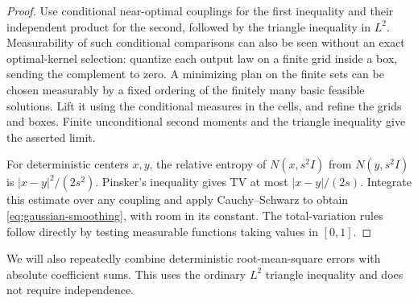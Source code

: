 \begin{proof}
Use conditional near-optimal couplings for the first
inequality and their independent product for the second,
followed by the triangle inequality in \(L^2\).
Measurability of such conditional comparisons can also be
seen without an exact optimal-kernel selection: quantize
each output law on a finite grid inside a box, sending
the complement to zero. A minimizing plan on the finite
sets can be chosen measurably by a fixed ordering of the
finitely many basic feasible solutions. Lift it using
the conditional measures in the cells, and refine the
grids and boxes. Finite unconditional second moments
and the triangle inequality give the asserted limit.

For deterministic centers \(x,y\), the relative entropy
of \(N(x,s^2I)\) from \(N(y,s^2I)\) is
\(|x-y|^2/(2s^2)\). Pinsker's inequality gives TV at most
\(|x-y|/(2s)\). Integrate this estimate over any coupling
and apply Cauchy--Schwarz to obtain
\eqref{eq:gaussian-smoothing}, with room in its constant.
The total-variation rules follow directly by testing
measurable functions taking values in \([0,1]\).
\end{proof}

We will also repeatedly combine deterministic root-mean-square
errors with absolute coefficient sums. This uses the
ordinary \(L^2\) triangle inequality and does not require
independence.
